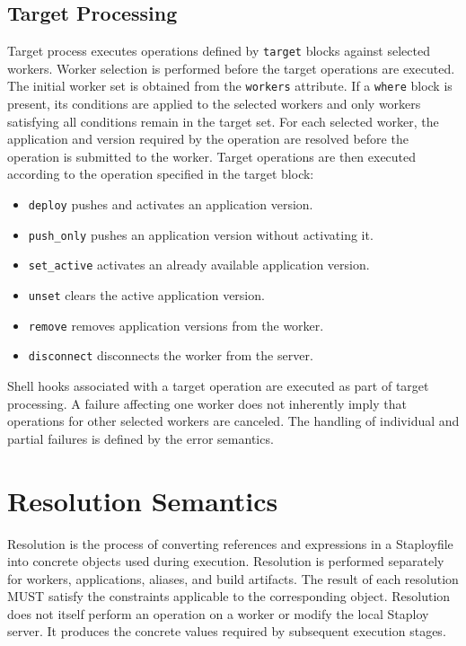 \documentclass[11pt,a4paper]{article}
\begin{document}
    \subsection{Target Processing}\label{subsec:target-processing}

    Target process executes operations defined by \texttt{target} blocks against selected workers.
    Worker selection is performed before the target operations are executed.
    The initial worker set is obtained from the \texttt{workers} attribute.
    If a \texttt{where} block is present, its conditions are applied to the selected workers and only workers satisfying all conditions remain in the target set.
    For each selected worker, the application and version required by the operation are resolved before the operation is submitted to the worker.
    Target operations are then executed according to the operation specified in the target block:

    \begin{itemize}
        \item \texttt{deploy} pushes and activates an application version.
        \item \texttt{push\_only} pushes an application version without activating it.
        \item \texttt{set\_active} activates an already available application version.
        \item \texttt{unset} clears the active application version.
        \item \texttt{remove} removes application versions from the worker.
        \item \texttt{disconnect} disconnects the worker from the server.
    \end{itemize}

    Shell hooks associated with a target operation are executed as part of target processing.
    A failure affecting one worker does not inherently imply that operations for other selected workers are canceled.
    The handling of individual and partial failures is defined by the error semantics.


    \section{Resolution Semantics}\label{sec:resolution-semantics}

    Resolution is the process of converting references and expressions in a Staployfile into concrete objects used during execution.
    Resolution is performed separately for workers, applications, aliases, and build artifacts.
    The result of each resolution MUST satisfy the constraints applicable to the corresponding object.
    Resolution does not itself perform an operation on a worker or modify the local Staploy server.
    It produces the concrete values required by subsequent execution stages.
\end{document}
